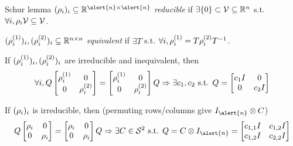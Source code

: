 \begin{frame}{Schur lemma}
  \noindent$(\induced_i)_i\subseteq \R^{\alert{n} \times \alert{n}}$ \emph{reducible} if $\exists \{0\} \subset \mathcal{V} \subseteq \mathbb{R}^n$ s.t. $\forall i, \rho_i \mathcal{V} \subseteq \mathcal{V}$.

  \noindent$(\rho^{(1)}_i)_i, (\rho^{(2)}_i)_i \subseteq \mathbb{R}^{n \times n}$ \emph{equivalent} if $\exists T$ s.t. $\forall i, \rho^{(1)}_i = T\rho^{(2)}_iT^{-1}$.

  If $(\rho^{(1)}_i)_i, (\rho^{(2)}_i)_i$ are irreducible and inequivalent, then
  $$
  \forall i,
  Q
  \begin{bmatrix}
    \rho^{(1)}_i & 0\\
    0 & \rho^{(2)}_i
  \end{bmatrix}
    =
  \begin{bmatrix}
    \rho^{(1)}_i & 0\\
    0 & \rho^{(2)}_i
  \end{bmatrix}
  Q
  \Rightarrow
  \exists c_1, c_2 \text{ s.t. }
  Q =
  \begin{bmatrix}
    c_1 I & 0\\
    0 & c_2 I
  \end{bmatrix}
  $$

  If $(\rho_i)_i$ is irreducible, then (permuting rows/columns give
  $I_{\alert{n}} \otimes C$)
  $$
  Q
  \begin{bmatrix}
    \induced_i & 0\\
    0 & \induced_i
  \end{bmatrix}
    =
  \begin{bmatrix}
    \induced_i & 0\\
    0 & \induced_i
  \end{bmatrix}
  Q
  \Rightarrow
  \exists C \in \SymK[2] \text{ s.t. }
  Q = C \otimes I_{\alert{n}} =
  \begin{bmatrix}
    c_{1,1}I & c_{1,2}I\\
    c_{1,2}I & c_{2,2}I
  \end{bmatrix}
  $$


\end{frame}
